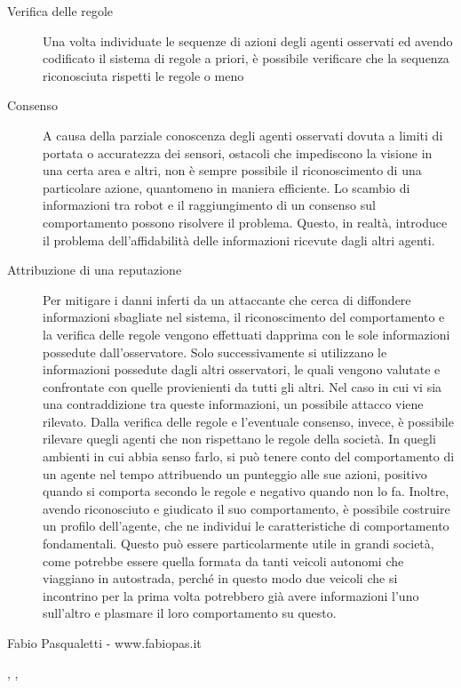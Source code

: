 \documentclass[paper=a4, fontsize=11pt]{scrartcl} %
\numberwithin{equation}{section} %
\numberwithin{figure}{section} %
\numberwithin{table}{section} %
\begin{document}
\begin{description}
\item[Verifica delle regole] Una volta individuate le sequenze di azioni 
	degli agenti osservati ed avendo codificato il sistema di regole
	a priori, è possibile verificare che la sequenza riconosciuta rispetti le regole o meno 
\item[Consenso] A causa della parziale conoscenza degli agenti osservati
dovuta a limiti di portata o accuratezza dei sensori, ostacoli che impediscono
la visione in una certa area e altri, non è sempre possibile il riconoscimento di una particolare azione, quantomeno in maniera efficiente.
Lo scambio di informazioni tra robot e il raggiungimento di un consenso 
sul comportamento possono risolvere il problema. Questo, in realtà, 
introduce il problema dell'affidabilità delle informazioni ricevute dagli 
altri agenti.  
\item[Attribuzione di una reputazione] Per mitigare i danni inferti 
da un attaccante che cerca di diffondere informazioni sbagliate nel sistema,
il riconoscimento del comportamento e la verifica delle regole vengono
effettuati dapprima con le sole informazioni possedute dall'osservatore.
Solo successivamente si utilizzano le informazioni possedute dagli altri
osservatori, le quali vengono valutate e confrontate con quelle provienienti da tutti gli altri. Nel caso in cui vi sia una contraddizione tra queste informazioni, un possibile attacco viene rilevato. Dalla verifica delle 
regole e l'eventuale consenso, invece, è possibile rilevare quegli agenti
che non rispettano le regole della società. In quegli ambienti in cui abbia senso farlo, si può tenere conto del comportamento di un agente nel tempo 
attribuendo un punteggio alle sue azioni, positivo quando si comporta secondo le regole e negativo quando non lo fa. Inoltre, avendo riconosciuto
e giudicato il suo comportamento, è possibile costruire un profilo dell'agente, che ne individui le caratteristiche di comportamento fondamentali. Questo può essere particolarmente utile in grandi società,
come potrebbe essere quella formata da tanti veicoli autonomi che viaggiano
in autostrada, perché in questo modo due veicoli che si incontrino per la
prima volta potrebbero già avere informazioni l'uno sull'altro e plasmare
il loro comportamento su questo.
\end{description}
Fabio Pasqualetti - www.fabiopas.it


\cite{IDS1}, \cite{IDS2}, \cite{IDS3}

\clearpage

\end{document}
